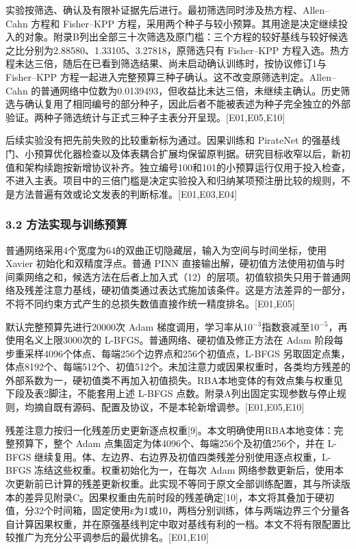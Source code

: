 \documentclass[11pt,a4paper]{article}
\begin{document}
实验按筛选、确认及有限补证据先后进行。最初筛选同时涉及热方程、Allen--Cahn 方程和 Fisher--KPP 方程，采用两个种子与较小预算。其用途是决定继续投入的对象。附录B列出全部三十次筛选及原门槛：三个方程的较好基线与较好候选之比分别为2.88580、1.33105、3.27818，原筛选只有 Fisher--KPP 方程入选。热方程未达三倍，随后在已看到筛选结果、尚未启动确认训练时，按协议修订1与 Fisher--KPP 方程一起进入完整预算三种子确认。这不改变原筛选判定。Allen--Cahn 的普通网络中位数为0.0139493，但收益比未达三倍，未继续主确认。历史筛选与确认复用了相同编号的部分种子，因此后者不能被表述为种子完全独立的外部验证。两种子筛选统计与正式三种子主表分开呈现。{[}E01,E05,E10{]}

后续实验没有把先前失败的比较重新标为通过。因果训练和 PirateNet 的强基线门、小预算优化器检查以及体表耦合扩展均保留原判据。研究目标收窄以后，新初值和架构续跑按新增协议补齐。独立编号100和101的小预算运行仅用于投入检查，不进入主表。项目中的三倍门槛是决定实验投入和归纳某项预注册比较的规则，不是方法普遍有效或论文发表的判断标准。{[}E01,E03,E04{]}

\subsubsection{3.2 方法实现与训练预算}\label{ux65b9ux6cd5ux5b9eux73b0ux4e0eux8badux7ec3ux9884ux7b97}

普通网络采用4个宽度为64的双曲正切隐藏层，输入为空间与时间坐标，使用 Xavier 初始化和双精度浮点。普通 PINN 直接输出解，硬初值方法使用初值与时间乘网络之和，候选方法在后者上加入式（12）的层项。初值软损失只用于普通网络及残差注意力基线，硬初值类通过表达式施加该条件。这是方法差异的一部分，不将不同约束方式产生的总损失数值直接作统一精度排名。{[}E01,E05{]}

默认完整预算先进行20000次 Adam 梯度调用，学习率从10\ensuremath{^{-3}}指数衰减至10\ensuremath{^{-5}}，再使用名义上限3000次的 L-BFGS。普通网络、硬初值及修正方法在 Adam 阶段每步重采样4096个体点、每端256个边界点和256个初值点，L-BFGS 另取固定点集，体点8192个、每端512个、初值512个。未加注意力或因果权重时，各类均方残差的外部系数为一，硬初值类不再加入初值损失。RBA本地变体的有效点集与权重见下段及表2脚注，不能套用上述 L-BFGS 点数。附录A列出固定实现参数与停止规则，均摘自既有源码、配置及协议，不是本轮新增调参。{[}E01,E05,E10{]}

残差注意力按归一化残差历史更新逐点权重{[}9{]}。本文明确使用RBA本地变体：完整预算下，整个 Adam 点集固定为体4096个、每端256个及初值256个，并在 L-BFGS 继续复用。体、左边界、右边界及初值四类残差分别使用逐点权重，L-BFGS 冻结这些权重。权重初始化为一，在每次 Adam 网络参数更新后，使用本次更新前已计算的残差更新权重。此实现不等同于原文全部训练配置，其与所读版本的差异见附录C。因果权重由先前时段的残差确定{[}10{]}，本文将其叠加于硬初值，分32个时间箱，固定使用ε为1或10，两档分别训练，体与两端边界三个分量各自计算因果权重，并在原强基线判定中取对基线有利的一档。本文不将有限配置比较推广为充分公平调参后的最优排名。{[}E01,E10{]}
\end{document}
